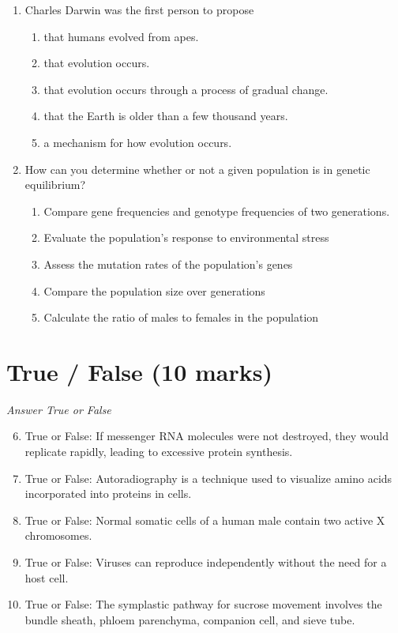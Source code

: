 \documentclass[12pt]{article}
\begin{document}
\begin{enumerate}[label=\arabic*.]
\begin{enumerate}[label=(\alph*)]
\end{enumerate}
\item Charles Darwin was the first person to propose
\begin{enumerate}[label=(\alph*)]
    \item that humans evolved from apes.
    \item that evolution occurs.
    \item that evolution occurs through a process of gradual change.
    \item that the Earth is older than a few thousand years.
    \item a mechanism for how evolution occurs.
\end{enumerate}
\item How can you determine whether or not a given population is in genetic equilibrium?
\begin{enumerate}[label=(\alph*)]
    \item Compare gene frequencies and genotype frequencies of two generations.
    \item Evaluate the population's response to environmental stress
    \item Assess the mutation rates of the population's genes
    \item Compare the population size over generations
    \item Calculate the ratio of males to females in the population
\end{enumerate}
\end{enumerate}

\section*{True / False (10 marks)}
\textit{Answer True or False}
\begin{enumerate}[label=\arabic*.]
\setcounter{enumi}{5}
\item True or False: If messenger RNA molecules were not destroyed, they would replicate rapidly, leading to excessive protein synthesis.
\item True or False: Autoradiography is a technique used to visualize amino acids incorporated into proteins in cells.
\item True or False: Normal somatic cells of a human male contain two active X chromosomes.
\item True or False: Viruses can reproduce independently without the need for a host cell.
\item True or False: The symplastic pathway for sucrose movement involves the bundle sheath, phloem parenchyma, companion cell, and sieve tube.
\end{enumerate}
\end{document}
